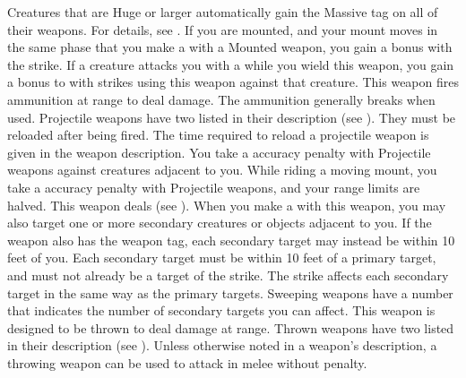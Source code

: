         Creatures that are Huge or larger automatically gain the Massive tag on all of their weapons.
        For details, see .
        \label{Mounted Weapon} If you are mounted, and your mount moves in the same phase that you make a  with a Mounted weapon, you gain a   bonus with the strike.
         If a creature attacks you with a   while you wield this weapon, you  gain a  bonus to  with strikes using this weapon against that creature.
         This weapon fires ammunition at range to deal damage.
        The ammunition generally breaks when used.
        Projectile weapons have two  listed in their description (see ).
        They must be reloaded after being fired.
        The time required to reload a projectile weapon is given in the weapon description.
        You take a  accuracy penalty with Projectile weapons against creatures adjacent to you.
        While riding a moving mount, you take a  accuracy penalty with Projectile weapons, and your range limits are halved.
         This weapon deals  (see ).
        \label{Sweeping} When you make a   with this weapon, you may also target one or more secondary creatures or objects adjacent to you.
        If the weapon also has the  weapon tag, each secondary target may instead be within 10 feet of you.
        Each secondary target must be within 10 feet of a primary target, and must not already be a target of the strike.
        The strike affects each secondary target in the same way as the primary targets.
        Sweeping weapons have a number that indicates the number of secondary targets you can affect.
         This weapon is designed to be thrown to deal damage at range.
        Thrown weapons have two  listed in their description (see ).
        Unless otherwise noted in a weapon's description, a throwing weapon can be used to attack in melee without penalty.

